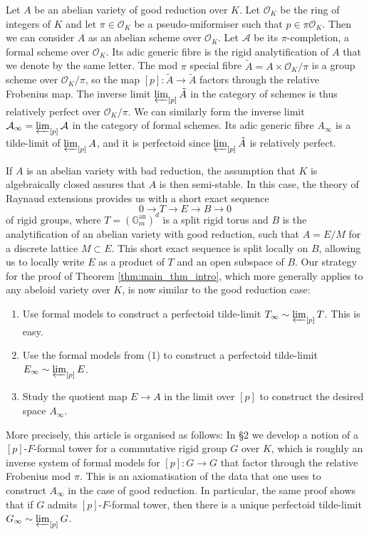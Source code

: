 \documentclass[10pt,oneside]{amsart}
\theoremstyle{definition}
\begin{document}
Let $A$ be an abelian variety of good reduction over $K$. Let $\mathcal O_K$ be the ring of integers of $K$ and let $\pi\in\mathcal O_K$ be a pseudo-uniformiser such that $p\in \pi\mathcal O_K$. Then we can consider $A$ as an abelian scheme over $\mathcal O_K$. Let $\mathcal A$ be its $\pi$-completion, a formal scheme over $\mathcal O_K$. Its adic generic fibre is the rigid analytification of $A$ that we denote by the same letter. The mod $\pi$ special fibre $\tilde{A} = A \times \mathcal O_K/\pi$ is a group scheme over $\mathcal O_K/\pi$, so the map $[p]:\tilde{A}\rightarrow \tilde{A}$ factors through the relative Frobenius map. The inverse limit $ \varprojlim_{[p]} \tilde{A} $ in the category of schemes is thus relatively perfect over $\mathcal O_K/\pi$. We can similarly form the inverse limit $\mathcal A_{\infty} = \varprojlim_{[p]} \mathcal A$ in the category of formal schemes. Its adic generic fibre $A_\infty$ is a tilde-limit of $\varprojlim_{[p]}A$, and it is perfectoid since $ \varprojlim_{[p]} \tilde{A} $ is relatively perfect.

If $A$ is an abelian variety with bad reduction, the assumption that $K$ is algebraically closed assures that $A$ is then semi-stable.
In this case, the theory of Raynaud extensions provides us with a short exact sequence 
\[ 0 \rightarrow T \rightarrow E  \rightarrow  B  \rightarrow  0\]
of rigid groups, where $T = (\mathbb G_m^{\text{an}})^{d}$ is a split rigid torus and $B$ is the analytification of an abelian variety with good reduction, such that $A = E/M$ for a discrete lattice $M \subset E$. This short exact sequence is split locally on $B$, allowing us to locally write $E$ as a product of $T$ and an open subspace of $B$.
Our strategy for the proof of Theorem \ref{thm:main_thm_intro}, which more generally applies to any abeloid variety over $K$, is now similar to the good reduction case:
\begin{enumerate}
\item Use formal models to construct a perfectoid tilde-limit $T_\infty\sim\varprojlim_{[p]} T$. This is easy.
\item Use the formal models from (1) to construct a perfectoid tilde-limit $E_\infty\sim\varprojlim_{[p]} E$.
\item Study the quotient map $E\rightarrow A$ in the limit over $[p]$ to construct the desired space $A_\infty$.
\end{enumerate}

More precisely, this article is organised as follows: In \S2 we develop a notion of a $[p]$-$F$-formal tower for a commutative rigid group $G$ over $K$, which is roughly an inverse system of formal models for $[p]:G\rightarrow G$ that factor through the relative Frobenius mod $\pi$. This is an axiomatisation of the data that one uses to construct $A_\infty$ in the case of good reduction. In particular, the same proof shows that if $G$ admits $[p]$-$F$-formal tower, then there is a unique perfectoid tilde-limit $G_\infty \sim  \varprojlim_{[p]} G$.
 
\end{document}
